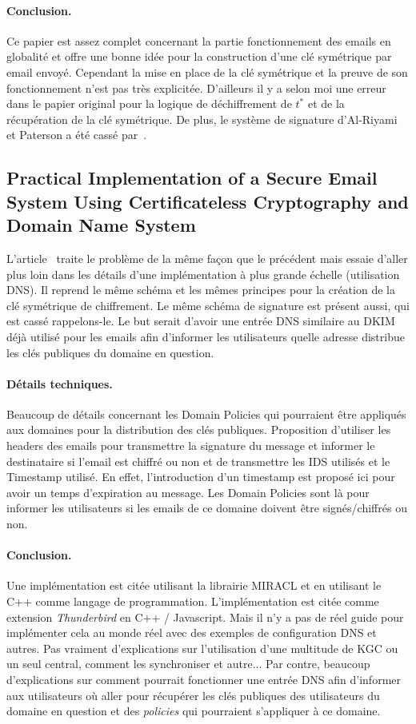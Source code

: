 \paragraph*{Conclusion.} Ce papier est assez complet concernant la partie fonctionnement des emails en globalité et offre une bonne idée pour la construction d'une clé symétrique par email envoyé. Cependant la mise en place de la clé symétrique et la preuve de son fonctionnement n'est pas très explicitée. D'ailleurs il y a selon moi une erreur dans le papier original pour la logique de déchiffrement de $t^*$ et de la récupération de la clé symétrique. De plus, le système de signature d'Al-Riyami et Paterson a été cassé par~\cite{conf/cans/HuangSMZ05}.

\subsection{Practical Implementation of a Secure Email System Using Certificateless Cryptography and Domain Name System}
L'article~\cite{journals/ijnsec/BalakrishnanR16} traite le problème de la même façon que le précédent mais essaie d'aller plus loin dans les détails d'une implémentation à plus grande échelle (utilisation DNS). Il reprend le même schéma et les mêmes principes pour la création de la clé symétrique de chiffrement. Le même schéma de signature est présent aussi, qui est cassé rappelons-le. Le but serait d'avoir une entrée DNS similaire au DKIM déjà utilisé pour les emails afin d'informer les utilisateurs quelle adresse distribue les clés publiques du domaine en question.

\paragraph*{Détails techniques.} Beaucoup de détails concernant les Domain Policies qui pourraient être appliqués aux domaines pour la distribution des clés publiques. Proposition d'utiliser les headers des emails pour transmettre la signature du message et informer le destinataire si l'email est chiffré ou non et de transmettre les IDS utilisés et le Timestamp utilisé. En effet, l'introduction d'un timestamp est proposé ici pour avoir un temps d'expiration au message. Les Domain Policies sont là pour informer les utilisateurs si les emails de ce domaine doivent être signés/chiffrés ou non.

\paragraph*{Conclusion.} Une implémentation est citée utilisant la librairie MIRACL et en utilisant le C++ comme langage de programmation. L'implémentation est citée comme extension \textit{Thunderbird} en C++ / Javascript. Mais il n'y a pas de réel guide pour implémenter cela au monde réel avec des exemples de configuration DNS et autres. Pas vraiment d'explications sur l'utilisation d'une multitude de KGC ou un seul central, comment les synchroniser et autre... Par contre, beaucoup d'explications sur comment pourrait fonctionner une entrée DNS afin d'informer aux utilisateurs où aller pour récupérer les clés publiques des utilisateurs du domaine en question et des \textit{policies} qui pourraient s'appliquer à ce domaine.


